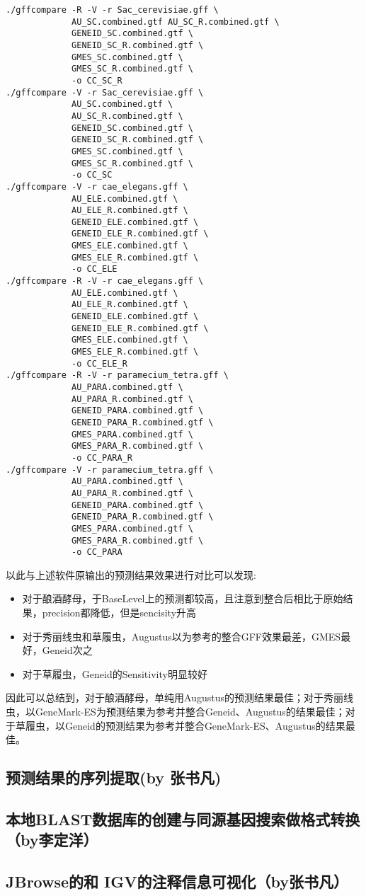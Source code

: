 \documentclass[12pt]{ctexart}
\begin{document}
\begin{lstlisting}
./gffcompare -R -V -r Sac_cerevisiae.gff \
             AU_SC.combined.gtf AU_SC_R.combined.gtf \
             GENEID_SC.combined.gtf \
             GENEID_SC_R.combined.gtf \
             GMES_SC.combined.gtf \
             GMES_SC_R.combined.gtf \
             -o CC_SC_R
./gffcompare -V -r Sac_cerevisiae.gff \
             AU_SC.combined.gtf \
             AU_SC_R.combined.gtf \
             GENEID_SC.combined.gtf \
             GENEID_SC_R.combined.gtf \
             GMES_SC.combined.gtf \
             GMES_SC_R.combined.gtf \
             -o CC_SC
./gffcompare -V -r cae_elegans.gff \
             AU_ELE.combined.gtf \
             AU_ELE_R.combined.gtf \
             GENEID_ELE.combined.gtf \
             GENEID_ELE_R.combined.gtf \
             GMES_ELE.combined.gtf \
             GMES_ELE_R.combined.gtf \
             -o CC_ELE
./gffcompare -R -V -r cae_elegans.gff \
             AU_ELE.combined.gtf \
             AU_ELE_R.combined.gtf \
             GENEID_ELE.combined.gtf \
             GENEID_ELE_R.combined.gtf \
             GMES_ELE.combined.gtf \
             GMES_ELE_R.combined.gtf \
             -o CC_ELE_R
./gffcompare -R -V -r paramecium_tetra.gff \
             AU_PARA.combined.gtf \
             AU_PARA_R.combined.gtf \
             GENEID_PARA.combined.gtf \
             GENEID_PARA_R.combined.gtf \
             GMES_PARA.combined.gtf \
             GMES_PARA_R.combined.gtf \
             -o CC_PARA_R
./gffcompare -V -r paramecium_tetra.gff \
             AU_PARA.combined.gtf \
             AU_PARA_R.combined.gtf \
             GENEID_PARA.combined.gtf \
             GENEID_PARA_R.combined.gtf \
             GMES_PARA.combined.gtf \
             GMES_PARA_R.combined.gtf \
             -o CC_PARA
\end{lstlisting}

以此与上述软件原输出的预测结果效果进行对比可以发现:

\begin{itemize}
    \item 对于酿酒酵母，于BaseLevel上的预测都较高，且注意到整合后相比于原始结果，precision都降低，但是sencisity升高
    \item 对于秀丽线虫和草履虫，Augustus以为参考的整合GFF效果最差，GMES最好，Geneid次之
    \item 对于草履虫，Geneid的Sensitivity明显较好
\end{itemize}

因此可以总结到，对于酿酒酵母，单纯用Augustus的预测结果最佳；对于秀丽线虫，以GeneMark-ES为预测结果为参考并整合Geneid、Augustus的结果最佳；对于草履虫，以Geneid的预测结果为参考并整合GeneMark-ES、Augustus的结果最佳。

\subsection{预测结果的序列提取(by 张书凡)}

\subsection{本地BLAST数据库的创建与同源基因搜索做格式转换（by李定洋）}


\subsection{JBrowse的和 IGV的注释信息可视化（by张书凡）}

\newpage



\end{document}
